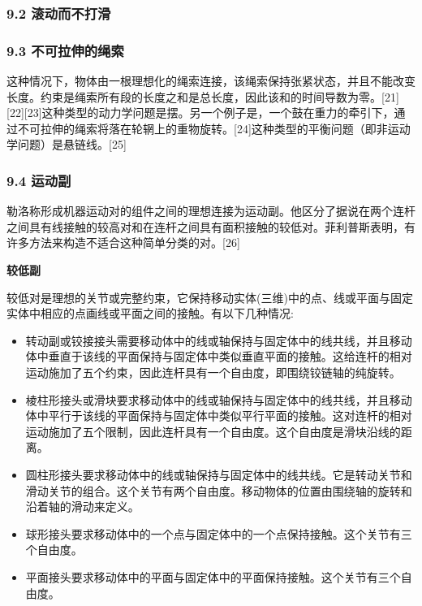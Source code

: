 \subsubsection{9.2 滚动而不打滑}



\subsubsection{9.3 不可拉伸的绳索}

这种情况下，物体由一根理想化的绳索连接，该绳索保持张紧状态，并且不能改变长度。约束是绳索所有段的长度之和是总长度，因此该和的时间导数为零。[21][22][23]这种类型的动力学问题是摆。另一个例子是，一个鼓在重力的牵引下，通过不可拉伸的绳索将落在轮辋上的重物旋转。[24]这种类型的平衡问题（即非运动学问题）是悬链线。[25]

\subsubsection{9.4 运动副}

勒洛称形成机器运动对的组件之间的理想连接为运动副。他区分了据说在两个连杆之间具有线接触的较高对和在连杆之间具有面积接触的较低对。菲利普斯表明，有许多方法来构造不适合这种简单分类的对。[26]

\textbf{较低副}

较低对是理想的关节或完整约束，它保持移动实体(三维)中的点、线或平面与固定实体中相应的点画线或平面之间的接触。有以下几种情况:

\begin{itemize}
\item 转动副或铰接接头需要移动体中的线或轴保持与固定体中的线共线，并且移动体中垂直于该线的平面保持与固定体中类似垂直平面的接触。这给连杆的相对运动施加了五个约束，因此连杆具有一个自由度，即围绕铰链轴的纯旋转。
\item 棱柱形接头或滑块要求移动体中的线或轴保持与固定体中的线共线，并且移动体中平行于该线的平面保持与固定体中类似平行平面的接触。这对连杆的相对运动施加了五个限制，因此连杆具有一个自由度。这个自由度是滑块沿线的距离。
\item 圆柱形接头要求移动体中的线或轴保持与固定体中的线共线。它是转动关节和滑动关节的组合。这个关节有两个自由度。移动物体的位置由围绕轴的旋转和沿着轴的滑动来定义。
\item 球形接头要求移动体中的一个点与固定体中的一个点保持接触。这个关节有三个自由度。
\item 平面接头要求移动体中的平面与固定体中的平面保持接触。这个关节有三个自由度。
\end{itemize}



